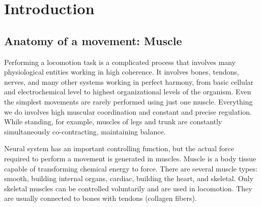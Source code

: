 

\chapter{Introduction}

\section{Anatomy of a movement: Muscle} %
Performing a locomotion task is a complicated process that involves many physiological entities working in high coherence. It involves bones, tendons, nerves, and many other systems working in perfect harmony, from basic cellular and electrochemical level to highest organizational levels of the organism. Even the simplest movements are rarely performed using just one muscle. Everything we do involves high muscular coordination and constant and precise regulation. While standing, for example, muscles of legs and trunk are constantly simultaneously co-contracting, maintaining balance.  

Neural system has an important controlling function, but the actual force required to perform a movement is generated in muscles. Muscle is a body tissue capable of transforming chemical energy to force. There are several muscle types: smooth, building internal organs, cardiac, building the heart, and skeletal. Only skeletal muscles can be controlled voluntarily and are used in locomotion. They are usually connected to bones with tendons (collagen fibers).

